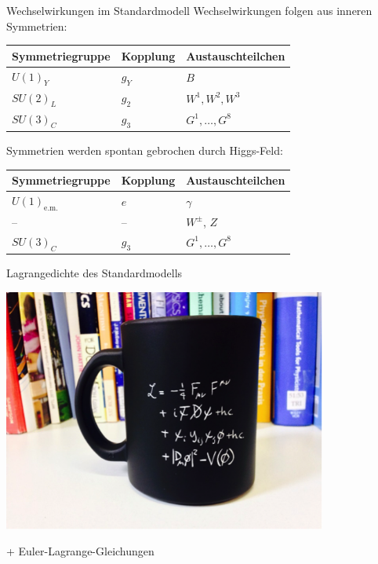 \documentclass[hyperref={pdfpagelabels=false},ngerman]{beamer}
\begin{document}
\begin{frame}{Wechselwirkungen im Standardmodell}
  Wechselwirkungen folgen aus inneren Symmetrien:
  \begin{center}
    \begin{tabular}{lll}
      \toprule
      Symmetriegruppe & Kopplung & Austauschteilchen\\
      \midrule
      $U(1)_Y$  & $g_Y$ & $B$ \\
      $SU(2)_L$ & $g_2$ & $W^1, W^2, W^3$ \\
      $SU(3)_C$ & $g_3$ & $G^1, \dots, G^8$ \\
      \bottomrule
    \end{tabular}
  \end{center}
  Symmetrien werden spontan gebrochen durch Higgs-Feld:
  \begin{center}
    \begin{tabular}{lll}
      \toprule
      Symmetriegruppe & Kopplung & Austauschteilchen\\
      \midrule
      $U(1)_\text{e.m.}$ & $e$ & $\gamma$ \\
      -- & -- & $W^{\pm}$, $Z$ \\
      $SU(3)_C$ & $g_3$ & $G^1, \dots, G^8$ \\
      \bottomrule
    \end{tabular}
  \end{center}
\end{frame}

\begin{frame}{Lagrangedichte des Standardmodells}
  \begin{center}
    \includegraphics[width=0.8\textwidth]{images/cup.png}
  \end{center}
  + Euler-Lagrange-Gleichungen
\end{frame}
\end{document}

